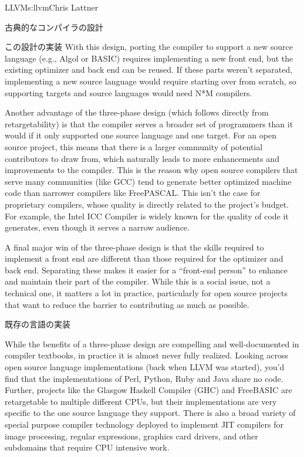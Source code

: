 \begin{aosachapter}{LLVM}{s:llvm}{Chris Lattner}
\begin{aosasect1}{古典的なコンパイラの設計}
\begin{aosasect2}{この設計の実装}
With this design, porting the compiler to support a new source
language (e.g.,  Algol or BASIC) requires implementing a new front end,
but the existing optimizer and back end can be reused.  If these parts
weren't separated, implementing a new source language would require
starting over from scratch, so supporting  targets and
 source languages would need N*M compilers.

Another advantage of the three-phase design (which follows directly
from retargetability) is that the compiler serves a broader set of
programmers than it would if it only supported one source language and
one target. For an open source project, this means that there is a
larger community of potential contributors to draw from, which
naturally leads to more enhancements and improvements to the compiler.
This is the reason why open source compilers that serve many
communities (like GCC) tend to generate better optimized machine code
than narrower compilers like FreePASCAL\@.  This isn't the case for
proprietary compilers, whose quality is directly related to the
project's budget.  For example, the Intel ICC Compiler is widely known
for the quality of code it generates, even though it serves a narrow
audience.

A final major win of the three-phase design is that the skills
required to implement a front end are different than those required for
the optimizer and back end.  Separating these makes it easier for a
``front-end person'' to enhance and maintain their part of the
compiler.  While this is a social issue, not a technical one, it
matters a lot in practice, particularly for open source projects
that want to reduce the barrier to contributing as much as possible.

\end{aosasect2}

\end{aosasect1}

\begin{aosasect1}{既存の言語の実装}

While the benefits of a three-phase design are compelling and
well-documented in compiler textbooks, in practice it is almost never
fully realized. Looking across open source language implementations
(back when LLVM was started), you'd find that the implementations of
Perl, Python, Ruby and Java share no code.  Further, projects like the
Glasgow Haskell Compiler (GHC) and FreeBASIC are retargetable to
multiple different CPUs, but their implementations are very specific
to the one source language they support.  There is also a broad
variety of special purpose compiler technology deployed to implement
JIT compilers for image processing, regular expressions, graphics card
drivers, and other subdomains that require CPU intensive work.


\end{aosasect1}
\end{aosachapter}
